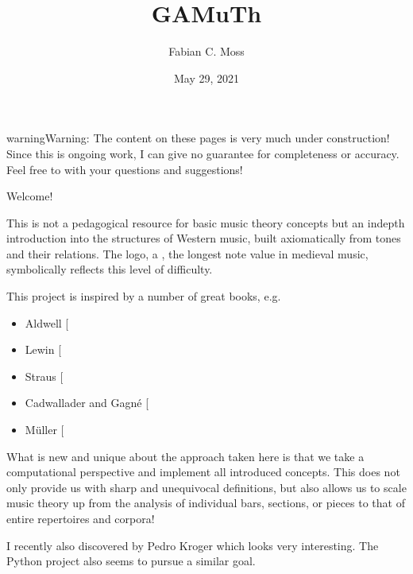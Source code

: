 \documentclass[letterpaper,10pt,english]{sphinxmanual}
\title{GAMuTh}
\date{May 29, 2021}
\author{Fabian C.\@{} Moss}
\begin{document}
\pagestyle{empty}
\sphinxmaketitle
\pagestyle{plain}
\sphinxtableofcontents
\pagestyle{normal}
\label{\detokenize{index::doc}}


\begin{sphinxadmonition}{warning}{Warning:}
The content on these pages is very much under construction!
Since this is ongoing work, I can give no guarantee for completeness or accuracy.
Feel free to  with your questions and suggestions!
\end{sphinxadmonition}

Welcome!

This is not a pedagogical resource for basic music theory concepts
but an in\sphinxhyphen{}depth introduction into the structures of Western music,
built axiomatically from tones and their relations.
The logo, a , the longest note value in medieval music,
symbolically reflects this level of difficulty.

This project is inspired by a number of great books, e.g.
\begin{itemize}
\item {} 
Aldwell  {[}\sphinxcite{8_bibliography:id4}{]}

\item {} 
Lewin {[}\sphinxcite{8_bibliography:id2}{]}

\item {} 
Straus {[}\sphinxcite{8_bibliography:id3}{]}

\item {} 
Cadwallader and Gagné {[}\sphinxcite{8_bibliography:id5}{]}

\item {} 
Müller {[}\sphinxcite{8_bibliography:id7}{]}

\end{itemize}

What is new and unique about the approach taken here is that we take
a computational perspective and implement all introduced concepts.
This does not only provide us with sharp and unequivocal definitions,
but also allows us to scale music theory up from the analysis of individual
bars, sections, or pieces to that of entire repertoires and corpora!

I recently also discovered  by Pedro Kroger
which looks very interesting.
The Python project  also seems to pursue a similar goal.
\end{document}
